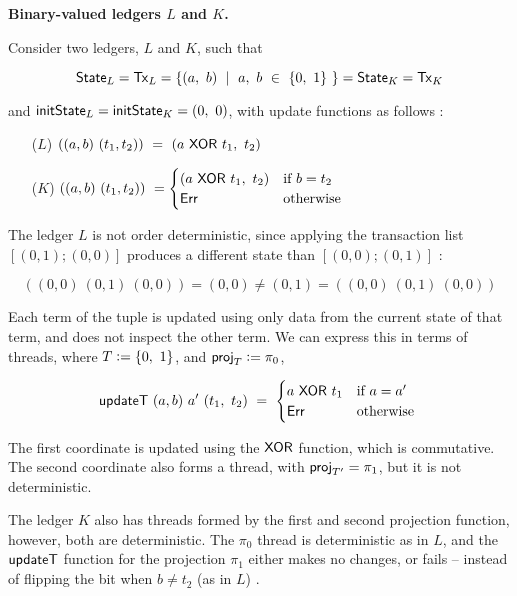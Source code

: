 \textbf{Binary-valued ledgers $L$ and $K$.}

Consider two ledgers, $L$ and $K$, such that

\[ \mathsf{State}_L = \mathsf{Tx}_L = \{ (a,~b)~\mid~a,~ b~ \in~ \{ 0,~1\}~\}  =  \mathsf{State}_K = \mathsf{Tx}_K \]

and $\mathsf{initState}_L = \mathsf{initState}_K = (0,~0)$, with update functions as follows :

\begin{itemize}
  \item[($L$)] $((a,b) ~(t_1,t_2))~ =~ (a~\mathsf{XOR}~t_1,~t_2)$

  \item[($K$)] $((a,b) ~(t_1,t_2))~ = \begin{cases}
    (a~\mathsf{XOR}~t_1,~t_2) & \text{if } b = t_2 \\
    \mathsf{Err} & \text{otherwise }
  \end{cases} $
\end{itemize}

The ledger $L$ is not order deterministic, since applying the transaction list $[ (0,1) ; (0,0) ]$
produces a different state than $[ (0,0) ; (0,1) ]$ :

\[ ((0,0) ~(0,1)~(0,0)) = (0, 0) \neq (0, 1) = ((0,0) ~(0,1)~(0,0)) \]

Each term of the tuple is updated using only data from the current state of that term, and
does not inspect the other term. We can express this in terms of threads, where $T \mathrel{\mathop:}= \{ 0,~1 \}$,
and $\mathsf{proj}_T \mathrel{\mathop:}= \pi_0$,

\[ \mathsf{updateT}~(a,b)~a'~(t_1,~t_2)~=~\begin{cases}
  a~\mathsf{XOR}~t_1 & \text{if } a = a' \\
  \mathsf{Err} & \text{otherwise }
\end{cases} \]

The first coordinate is updated using the $\mathsf{XOR}$ function, which is commutative.
The second coordinate also forms a thread, with $\mathsf{proj}_{T'} = \pi_1$, but it
is not deterministic.


The ledger $K$ also has threads formed by the first and second projection function,
however, both are deterministic. The $\pi_0$ thread is deterministic as in $L$, and
the $\mathsf{updateT}$ function for the projection $\pi_1$
either makes no changes, or fails -- instead of flipping the bit when $b \neq t_2$ (as in $L$) .

